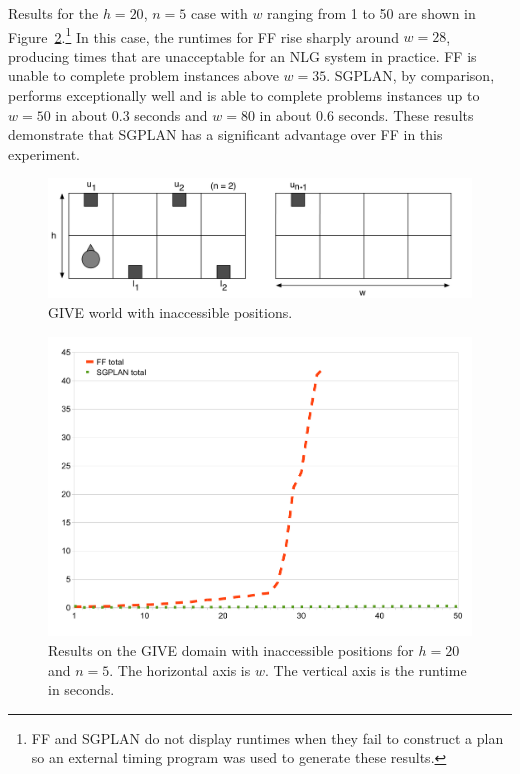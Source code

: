 Results for the $h=20$, $n=5$ case with $w$ ranging from 1 to 50 are shown
in Figure~\ref{fig:give-runtime-nosoln}.\footnote{FF and SGPLAN do
 not display runtimes when they fail to construct a plan so an external timing
 program was used to generate these results.}
In this case, the runtimes for FF rise sharply around $w=28$, producing
times that are unacceptable for an NLG system in practice. FF is unable
to complete problem instances above $w=35$. SGPLAN, by comparison, performs
exceptionally well and is able to complete problems instances up to $w=50$
in about 0.3 seconds and $w=80$ in about 0.6 seconds. These results
demonstrate that SGPLAN has a significant advantage over FF in this
experiment. 

\begin{figure}[t]
  \centering
  \includegraphics[width=0.85\columnwidth]{pic-empty-inaccessible}
  \caption{GIVE world with inaccessible positions.}
  \label{fig:give-junk-nosoln}
\end{figure}

\begin{figure}
  \centering
  \includegraphics[width=0.85\columnwidth]{graph-exp4}
  \caption{Results on the GIVE domain with inaccessible
    positions for $h=20$ and $n=5$. The horizontal axis is $w$.
    The vertical axis is the runtime in seconds.}
  \label{fig:give-runtime-nosoln}
\end{figure}



